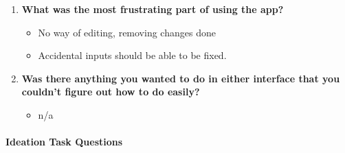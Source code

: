 \documentclass[12pt,a4paper]{article}
\begin{document}
\begin{enumerate}
    \item \textbf{What was the most frustrating part of using the app?}
    
    \begin{itemize}
        \item No way of editing, removing changes done
        \item Accidental inputs should be able to be fixed.
    \end{itemize}
    
    \item \textbf{Was there anything you wanted to do in either interface that you couldn't figure out how to do easily?}
    
    \begin{itemize}
        \item n/a
    \end{itemize}
\end{enumerate}

\paragraph{Ideation Task Questions}
\end{document}
